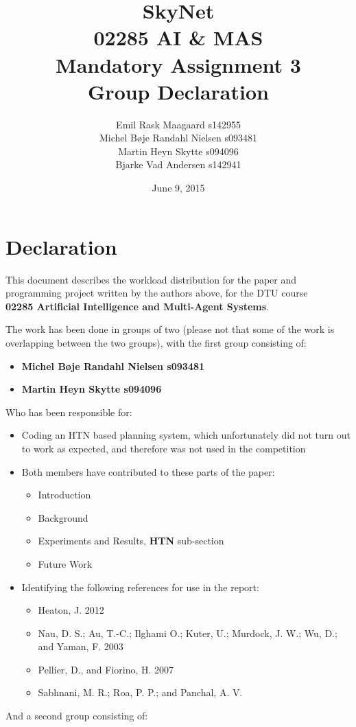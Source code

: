 \documentclass[letterpaper]{article}
\title{SkyNet\\02285 AI \& MAS\\Mandatory Assignment 3\\Group Declaration}
\date{June 9, 2015}
\author{Emil Rask Maagaard s142955\\Michel B\o je Randahl Nielsen s093481 
\\Martin Heyn Skytte s094096\\Bjarke Vad Andersen s142941}
\begin{document}
\maketitle
\section*{Declaration}
This document describes the workload distribution for the paper and programming project written by the
authors above, for the DTU course\\
\textbf{02285 Artificial Intelligence and Multi-Agent Systems}.

The work has been done in groups of two (please not that some of the work is
overlapping between the two groups), with the first group consisting of:
\begin{itemize}
\item \textbf{Michel B\o je Randahl Nielsen s093481 }
\item \textbf{Martin Heyn Skytte s094096}
\end{itemize}

Who has been responsible for:
\begin{itemize}
\item Coding an HTN based planning system, which unfortunately did not turn out
  to work as expected, and therefore was not used in the competition
\item Both members have contributed to these parts of the paper:
  \begin{itemize}
  \item Introduction
  \item Background
  \item Experiments and Results, \textbf{HTN} sub-section
  \item Future Work
  \end{itemize}
\item Identifying the following references for use in the report:
  \begin{itemize}
  \item Heaton, J. 2012
  \item Nau, D. S.; Au, T.-C.; Ilghami O.; Kuter, U.; Murdock, J. W.; Wu, D.; and
  Yaman, F. 2003
  \item Pellier, D., and Fiorino, H. 2007
  \item Sabhnani, M. R.; Roa, P. P.; and Panchal, A. V.
  \end{itemize}
\end{itemize}

And a second group consisting of:
\end{document}
